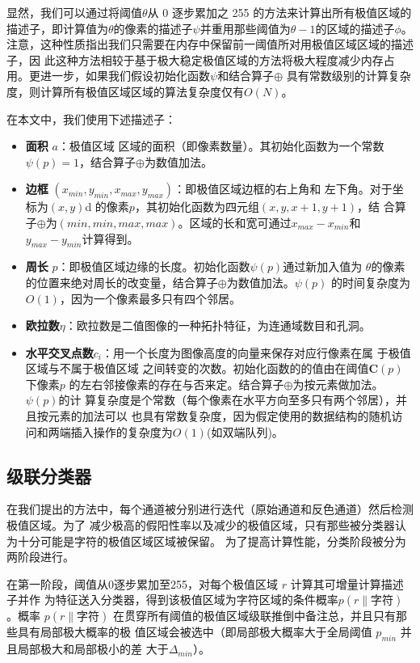 \documentclass[UTF8]{article}
\begin{document}
显然，我们可以通过将阈值$\theta$从 0 逐步累加之 255 的方法来计算出所有极值区域的描述子，即计算值为$\theta$的像素的描述子$\psi$并重用那些阈值为$\theta-1$的区域的描述子$\phi$。
注意，这种性质指出我们只需要在内存中保留前一阈值所对用极值区域区域的描述子，因
此这种方法相较于基于极大稳定极值区域的方法将极大程度减少内存占用。更进一步，如果我们假设初始化函数$\psi$和结合算子$\oplus$
具有常数级别的计算复杂度，则计算所有极值区域区域的算法复杂度仅有$O(N)$。

在本文中，我们使用下述描述子： 

\begin{itemize}
\item \textbf{面积} $a$：极值区域 区域的面积（即像素数量）。其初始化函数为一个常数
  $\psi(p)=1$，结合算子$\oplus$为数值加法。
\item \textbf{边框} $(x_{min}, y_{min}, x_{max}, y_{max})$：即极值区域边框的右上角和
  左下角。对于坐标为$(x,y)$d 的像素$p$，其初始化函数为四元组$(x,y,x+1,y+1)$，结
  合算子$\oplus$为$(min,min,max,max)$。区域的长和宽可通过$x_{max}-x_{min}$和
  $y_{max}-y_{min}$计算得到。
\item \textbf{周长} $p$：即极值区域边缘的长度。初始化函数$\psi(p)$通过新加入值为
  $\theta$的像素的位置来绝对周长的改变量，结合算子$\oplus$为数值加法。$\psi(p)$
  的时间复杂度为$O(1)$，因为一个像素最多只有四个邻居。
\item \textbf{欧拉数$\eta$}：欧拉数是二值图像的一种拓扑特征，为连通域数目和孔洞。
\item \textbf{水平交叉点数$c_i$}：用一个长度为图像高度的向量来保存对应行像素在属
  于极值区域与不属于极值区域 之间转变的次数。初始化函数的的值由在阈值$\mathbf{C}(p)$下像素$p$
  的左右邻接像素的存在与否来定。结合算子$\oplus$为按元素做加法。$\psi(p)$的计
  算复杂度是个常数（每个像素在水平方向至多只有两个邻居），并且按元素的加法可以
  也具有常数复杂度，因为假定使用的数据结构的随机访问和两端插入操作的复杂度为$O(1)$(如双端队列)。
\end{itemize}

\subsection{级联分类器}

在我们提出的方法中，每个通道被分别进行迭代（原始通道和反色通道）然后检测极值区域。为了
减少极高的假阳性率以及减少的极值区域，只有那些被分类器认为十分可能是字符的极值区域区域被保留。
为了提高计算性能，分类阶段被分为两阶段进行。

在第一阶段，阈值从0逐步累加至255，对每个极值区域 $r$ 计算其可增量计算描述子并作
为特征送入分类器，得到该极值区域为字符区域的条件概率$p(r\|字符)$。概率 $p(r\|字
符)$ 在贯穿所有阈值的极值区域级联推倒中备注总，并且只有那些具有局部极大概率的极
值区域会被选中（即局部极大概率大于全局阈值 $p_{min}$ 并且局部极大和局部极小的差
大于$\Delta_{min}$）。
\end{document}

